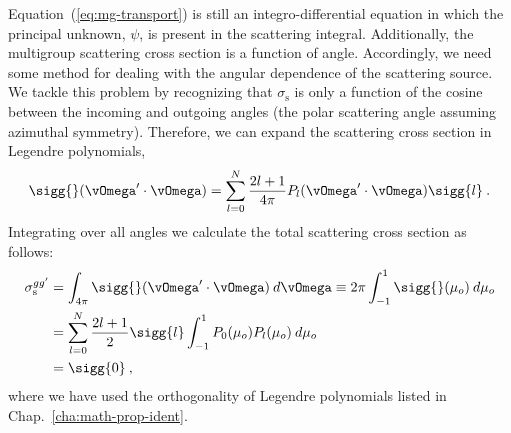\documentclass{article}
\numberwithin{equation}{subsection}
\begin{document}
Equation~(\ref{eq:mg-transport}) is still an integro-differential equation in
which the principal unknown, $\psi$, is present in the scattering integral.
Additionally, the multigroup scattering cross section is a function of angle.
Accordingly, we need some method for dealing with the angular dependence of
the scattering source.  We tackle this problem by recognizing that
$\sigma_{\text{s}}$ is only a function of the cosine between the incoming and
outgoing angles (the polar scattering angle assuming azimuthal symmetry).
Therefore, we can expand the scattering cross section in Legendre polynomials,
\begin{equation}
  \sigg{}(\vOmega'\cdot\vOmega)=\sum_{l=0}^{N}
  \frac{2l+1}{4\pi}P_{l}(\vOmega'\cdot\vOmega)
  \sigg{l}\:.
  \label{eq:legendre-expansion-scattering}
\end{equation}
Integrating over all angles we calculate the total scattering cross section as
follows:
\begin{equation}
  \begin{split}
    \sigma_{\text{s}}^{gg'} &=
    \int_{4\pi}\sigg{}(\vOmega'\cdot\vOmega)\:d\vOmega \equiv
    2\pi\int_{-1}^{1}\sigg{}(\mu_o)\:d\mu_o\\
    &=\sum_{l=0}^{N}\frac{2l+1}{2}\sigg{l}\int_{-1}^{1}
    P_0(\mu_o)P_l(\mu_o)\:d\mu_o\\
    &=\sigg{0}\:,
  \end{split}
\end{equation}
where we have used the orthogonality of Legendre polynomials listed in
Chap.~\ref{cha:math-prop-ident}.
\end{document}
